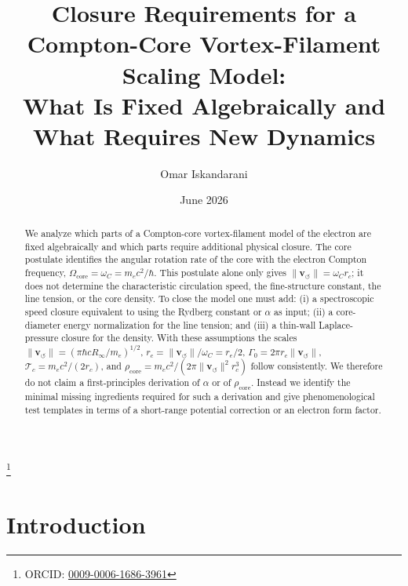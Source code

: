 \documentclass[aps,pra,preprint,longbibliography,nofootinbib]{revtex4-2}
\begin{document}
\title{Closure Requirements for a Compton-Core Vortex-Filament Scaling Model:\\
       What Is Fixed Algebraically and What Requires New Dynamics}

\author{Omar Iskandarani}
\thanks{ORCID: \href{https://orcid.org/0009-0006-1686-3961}{0009-0006-1686-3961}}
\date{June 2026}


\begin{abstract}
We analyze which parts of a Compton-core vortex-filament model of the
electron are fixed algebraically and which parts require additional
physical closure.  The core postulate identifies the angular rotation
rate of the core with the electron Compton frequency,
$\Omega_{\mathrm{core}}=\omega_C=m_e c^2/\hbar$.  This postulate alone
only gives $\lVert \mathbf{v}_{\!\boldsymbol{\circlearrowleft}}\rVert=\omega_C r_c$;
it does not determine the characteristic circulation speed, the
fine-structure constant, the line tension, or the core density.  To close
the model one must add: (i) a spectroscopic speed closure equivalent to
using the Rydberg constant or $\alpha$ as input; (ii) a core-diameter
energy normalization for the line tension; and (iii) a thin-wall
Laplace-pressure closure for the density.  With these assumptions the
scales
$\lVert \mathbf{v}_{\!\boldsymbol{\circlearrowleft}}\rVert=(\pi\hbar cR_\infty/m_e)^{1/2}$,
$r_c=\lVert \mathbf{v}_{\!\boldsymbol{\circlearrowleft}}\rVert/\omega_C=r_e/2$,
$\Gamma_0=2\pi r_c\lVert \mathbf{v}_{\!\boldsymbol{\circlearrowleft}}\rVert$,
$\mathcal{T}_c=m_ec^2/(2r_c)$, and
$\rho_{\mathrm{core}}=m_ec^2/(2\pi\lVert \mathbf{v}_{\!\boldsymbol{\circlearrowleft}}\rVert^2r_c^3)$
follow consistently.  We therefore do not claim a first-principles
derivation of $\alpha$ or of $\rho_{\mathrm{core}}$.  Instead we identify
the minimal missing ingredients required for such a derivation and give
phenomenological test templates in terms of a short-range potential
correction or an electron form factor.
\end{abstract}

\maketitle

\section{Introduction}
\label{sec:intro}
\end{document}
